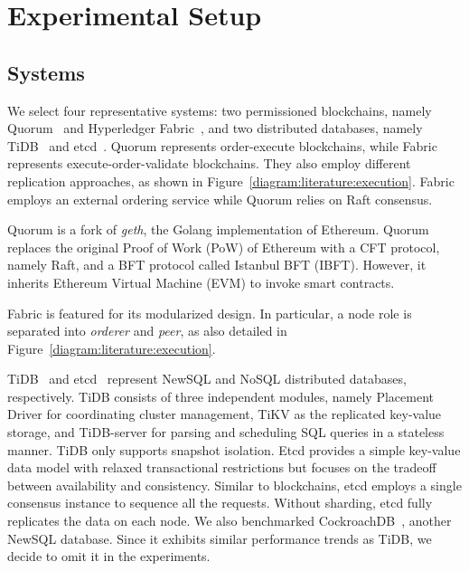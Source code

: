 \section{Experimental Setup}
\label{sec:twin:setup}
\subsection{Systems}

We select four representative systems: two permissioned blockchains, namely Quorum~\cite{web:quorum} and Hyperledger Fabric~\cite{web:fabric}, and two distributed databases, namely TiDB~\cite{web:tidb} and etcd~\cite{web:etcd}.
Quorum represents order-execute blockchains, while Fabric represents execute-order-validate blockchains. 
They also employ different replication approaches, as shown in Figure~\ref{diagram:literature:execution}.
Fabric employs an external ordering service while Quorum relies on Raft consensus.

Quorum is a fork of \textit{geth}, the Golang implementation of Ethereum. 
Quorum replaces the original Proof of Work (PoW) of Ethereum with a CFT protocol, namely Raft, and a BFT protocol called
Istanbul BFT (IBFT). However, it inherits Ethereum Virtual Machine (EVM) to invoke smart contracts.

Fabric is featured for its modularized design. 
In particular, a node role is separated into \textit{orderer} and \textit{peer}, as also detailed in Figure~\ref{diagram:literature:execution}.

TiDB~\cite{web:tidb} and etcd~\cite{web:etcd} represent NewSQL and NoSQL
distributed databases, respectively.
TiDB consists of three independent modules, namely Placement Driver for
coordinating cluster management, TiKV as the replicated key-value storage, and
TiDB-server for parsing and scheduling SQL queries in a stateless manner. TiDB
only supports snapshot isolation.
Etcd provides a simple key-value data model with relaxed transactional
restrictions but focuses on the tradeoff between availability and consistency.
Similar to blockchains, etcd employs a single consensus instance to sequence all
the requests.
Without sharding, etcd fully replicates the data on each node.
We also benchmarked CockroachDB~\cite{web:cockroach}, another NewSQL database. Since it exhibits similar performance trends as TiDB, we decide to omit it in the experiments. 

